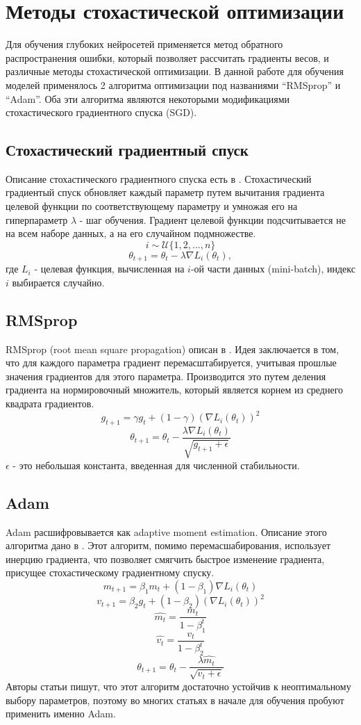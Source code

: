 \clearpage
\section{Методы стохастической оптимизации}
	Для обучения глубоких нейросетей применяется метод обратного распространения ошибки, который позволяет рассчитать градиенты весов, и различные методы стохастической оптимизации. В данной работе для обучения моделей применялось 2 алгоритма оптимизации под названиями ``RMSprop'' и ``Adam''. Оба эти алгоритма являются некоторыми модификациями стохастического градиентного спуска (SGD).
	\subsection{Стохастический градиентный спуск}
		Описание стохастического градиентного спуска есть в \cite{sgd}. Стохастический градиентый спуск обновляет каждый параметр путем вычитания градиента целевой функции по соответствующему параметру и умножая его на гиперпараметр $\lambda$ - шаг обучения. Градиент целевой функции подсчитывается не на всем наборе данных, а на его случайном подмножестве.
		$$ i \sim \mathcal{U}\{1, 2, ..., n\} $$
		$$ \theta_{t+1} = \theta_t - \lambda \nabla L_i(\theta_t), $$
		где $L_i$ - целевая функция, вычисленная на $i$-ой части данных (mini-batch), индекс $i$ выбирается случайно.
	\subsection{RMSprop}
		RMSprop (root mean square propagation) описан в \cite{rmsprop}. Идея заключается в том, что для каждого параметра градиент перемасштабируется, учитывая прошлые значения градиентов для этого параметра. Производится это путем деления градиента на нормировочный множитель, который является корнем из среднего квадрата градиентов.
		$$ g_{t+1} = \gamma g_t + (1 - \gamma) (\nabla L_i(\theta_t))^2$$
		$$ \theta_{t+1} = \theta_t - \frac{\lambda \nabla L_i(\theta_t)}{\sqrt{g_{t+1} + \epsilon}} $$
		$\epsilon$ - это небольшая константа, введенная для численной стабильности.
	\subsection{Adam}
		Adam расшифровывается как adaptive moment estimation. Описание этого алгоритма дано в \cite{adam}. Этот алгоритм, помимо перемасшабирования, использует инерцию градиента, что позволяет смягчить быстрое изменение градиента, присущее стохастическому градиентному спуску.
		$$ m_{t+1} = \beta_1 m_t + (1 - \beta_1) \nabla L_i(\theta_t) $$
		$$ v_{t+1} = \beta_2 g_t + (1 - \beta_2) (\nabla L_i(\theta_t))^2 $$
		$$ \hat{m_t} = \frac{m_t}{1 - \beta_1^t} $$
		$$ \hat{v_t} = \frac{v_t}{1 - \beta_2^t}$$
		$$ \theta_{t+1} = \theta_t - \frac{\lambda \hat{m_t}}{\sqrt{v_t + \epsilon}} $$
		Авторы статьи \cite{adam} пишут, что этот алгоритм достаточно устойчив к неоптимальному выбору параметров, поэтому во многих статьях в начале для обучения пробуют применить именно Adam.